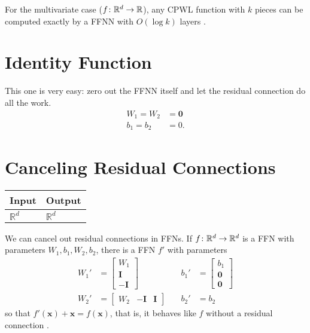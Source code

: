 For the multivariate case ($f \colon \mathbb{R}^d \to \mathbb{R}$), any CPWL function with $k$ pieces can be computed exactly by a FFNN with $O(\log k)$ layers \citep{arora+:2018}.

\section{Identity Function}\label{sec:ffnn_identity}

This one is very easy: zero out the FFNN itself and let the residual connection do all the work.
\begin{align*}
W_1 = W_2 &= \mathbf{0} \\
b_1 = b_2 &= 0.
\end{align*}

\section{Canceling Residual Connections}\label{sec:ffnn_cancel_residual}

    \begin{tabular}{|p{1.5cm}|p{1.5cm}|}
        \hline
        \rowcolor{orange!20} %
        \textbf{Input} & \textbf{Output} \\
        \hline
        $\mathbb{R}^d$ & $\mathbb{R}^d$ \\
        \hline
    \end{tabular}

    We can cancel out residual connections in FFNs. If $f\colon\mathbb{R}^d\to \mathbb{R}^d$ is a FFN with parameters $W_1, b_1, W_2, b_2$, there is a FFN $f'$ with parameters
    \begin{align*}
        W_1'&=\begin{bmatrix}
            W_1\\
            \textbf{I}\\
            -\textbf{I}
        \end{bmatrix}  &\quad b_1'&=\begin{bmatrix}
            b_1\\
            \textbf{0}\\
            \textbf{0}
        \end{bmatrix}\\
        W_2'&=\begin{bmatrix}
            W_2& -\textbf{I} & \textbf{I}
        \end{bmatrix}
        & \quad b_2' &= b_2
    \end{align*}
    so that $f'(\mathbf{x}) + \mathbf{x} = f(\mathbf{x})$, that is, it behaves like $f$ without a residual connection \citep{chiang+:icml2023}.

